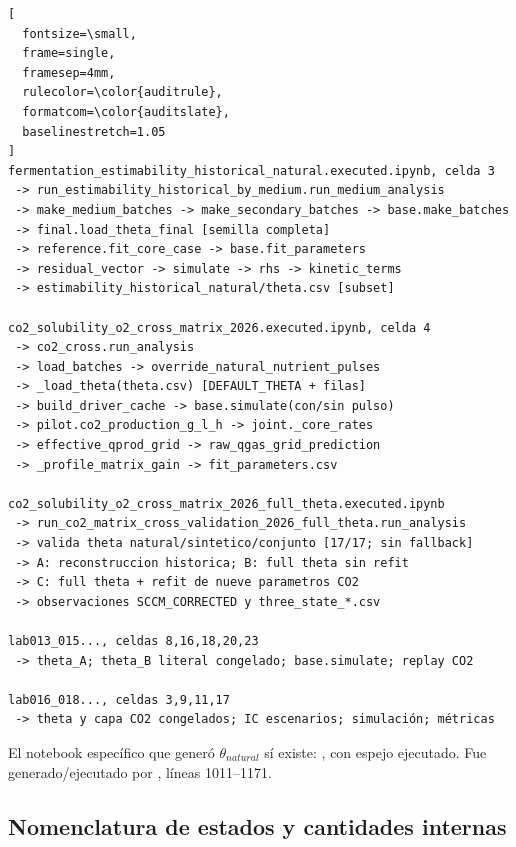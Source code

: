 \documentclass[11pt]{article}
\begin{document}
\begin{Verbatim}[
  fontsize=\small,
  frame=single,
  framesep=4mm,
  rulecolor=\color{auditrule},
  formatcom=\color{auditslate},
  baselinestretch=1.05
]
fermentation_estimability_historical_natural.executed.ipynb, celda 3
 -> run_estimability_historical_by_medium.run_medium_analysis
 -> make_medium_batches -> make_secondary_batches -> base.make_batches
 -> final.load_theta_final [semilla completa]
 -> reference.fit_core_case -> base.fit_parameters
 -> residual_vector -> simulate -> rhs -> kinetic_terms
 -> estimability_historical_natural/theta.csv [subset]

co2_solubility_o2_cross_matrix_2026.executed.ipynb, celda 4
 -> co2_cross.run_analysis
 -> load_batches -> override_natural_nutrient_pulses
 -> _load_theta(theta.csv) [DEFAULT_THETA + filas]
 -> build_driver_cache -> base.simulate(con/sin pulso)
 -> pilot.co2_production_g_l_h -> joint._core_rates
 -> effective_qprod_grid -> raw_qgas_grid_prediction
 -> _profile_matrix_gain -> fit_parameters.csv

co2_solubility_o2_cross_matrix_2026_full_theta.executed.ipynb
 -> run_co2_matrix_cross_validation_2026_full_theta.run_analysis
 -> valida theta natural/sintetico/conjunto [17/17; sin fallback]
 -> A: reconstruccion historica; B: full theta sin refit
 -> C: full theta + refit de nueve parametros CO2
 -> observaciones SCCM_CORRECTED y three_state_*.csv

lab013_015..., celdas 8,16,18,20,23
 -> theta_A; theta_B literal congelado; base.simulate; replay CO2

lab016_018..., celdas 3,9,11,17
 -> theta y capa CO2 congelados; IC escenarios; simulación; métricas
\end{Verbatim}

El notebook específico que generó $\theta_{natural}$ sí existe:
,
con espejo ejecutado. Fue generado/ejecutado por
, líneas 1011--1171.

\subsection{Nomenclatura de estados y cantidades internas}
\end{document}
